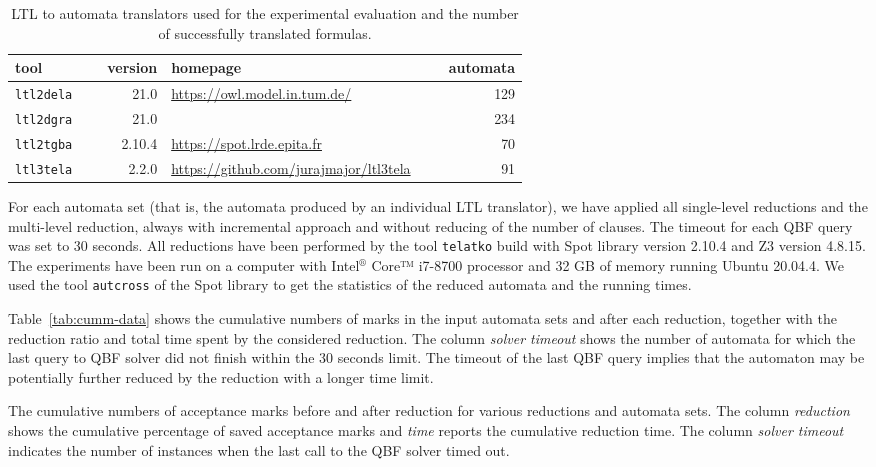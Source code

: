 \documentclass[runningheads]{llncs}
\begin{document}
\begin{table}[b]
\caption{LTL to automata translators used for the experimental evaluation
and the number of successfully translated formulas.}
\label{tab:ltltranslators}
\centering
\begin{tabular}{lr@{~~~~~~}lr}
\toprule
tool        & version&homepage & ~~~automata \\
\midrule
\texttt{ltl2dela}~~~ & 21.0 & \multirow{2}{*}{\url{https://owl.model.in.tum.de/}} & 129\\
\texttt{ltl2dgra} & 21.0 & & 234\\
\texttt{ltl2tgba} & 2.10.4 & \url{https://spot.lrde.epita.fr} & 70\\
\texttt{ltl3tela} & 2.2.0  & \url{https://github.com/jurajmajor/ltl3tela} & 91\\
\bottomrule
\end{tabular}
\end{table}

For each automata set (that is, the automata produced by an individual
LTL translator), we have applied all single-level reductions and the
multi-level reduction, always with incremental approach and without
reducing of the number of clauses. The timeout for each QBF query was
set to 30 seconds.
%
All reductions have been performed by the tool \texttt{telatko}
build with Spot library version 2.10.4 and Z3 version 4.8.15. The
experiments have been run on a computer with Intel$^\text{®}$ Core™ i7-8700
processor and 32 GB of memory running Ubuntu 20.04.4. We used the tool
\texttt{autcross} of the Spot library to get the statistics of the
reduced automata and the running times.

Table~\ref{tab:cumm-data} shows the cumulative numbers of marks in
the input automata sets and after each reduction, together with the
reduction ratio and total time spent by the considered reduction. The
column \textit{solver timeout} shows the number of automata for which
the last query to QBF solver did not finish within the 30 seconds
limit. The timeout of the last QBF query implies that the automaton
may be potentially further reduced by the reduction with a longer time
limit.

\begin{table}[t]
  \caption{The cumulative numbers of acceptance marks before and after
    reduction for various reductions and automata sets. The column
    \emph{reduction} shows the cumulative percentage of saved
    acceptance marks and \emph{time} reports the cumulative reduction
    time. The column \textit{solver timeout} indicates the number of
    instances when the last call to the QBF solver timed out.  }
\label{tab:cumm-data}
\centering
\setlength{\tabcolsep}{10pt}

\end{table}
\end{document}
